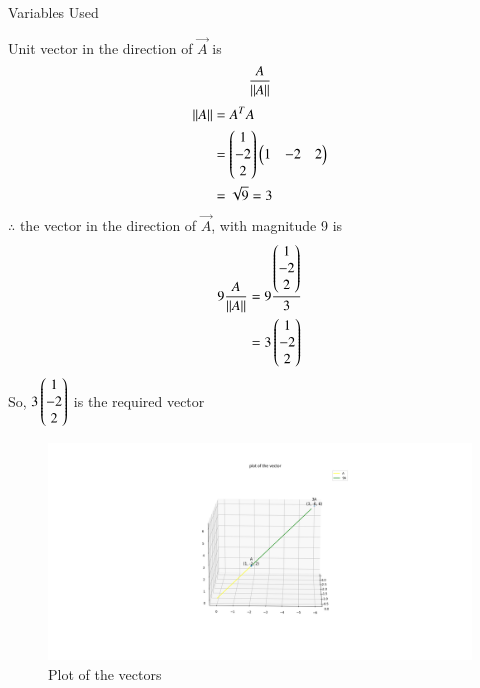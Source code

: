 \documentclass[journal]{IEEEtran}
\begin{document}
\begin{table}[h!]    
  \centering
  
  \caption{Variables Used}
  \label{tab1-1.9-6}
\end{table}
\solution
Unit vector in the direction of $\vec{A}$ is
\begin{align}
	\frac{A}{\left\lVert A\right\rVert}
\end{align}
\begin{align}
	\left\lVert A\right\rVert &= A^TA\\
	&= \begin{pmatrix}1\\-2\\2\end{pmatrix}\begin{pmatrix}1 & -2 & 2\end{pmatrix}\\
	&= \sqrt{9} = 3
\end{align}
$\therefore$ the vector in the direction of $\vec{A}$, with magnitude 9 is
\begin{align}
	9 \frac{A}{\left\lVert A\right\rVert} &= 9 \frac{\begin{pmatrix}1\\-2\\2\end{pmatrix}}{3}\\
	&= 3\begin{pmatrix}1\\-2\\2\end{pmatrix}
\end{align}
So, $3\begin{pmatrix}1\\-2\\2\end{pmatrix}$ is the required vector\\
\begin{figure}[h!]
   \centering
   \includegraphics[width = 1\linewidth]{figs/fig.png}
   \caption{Plot of the vectors}
   \label{stemplot}
\end{figure}
\end{document}
